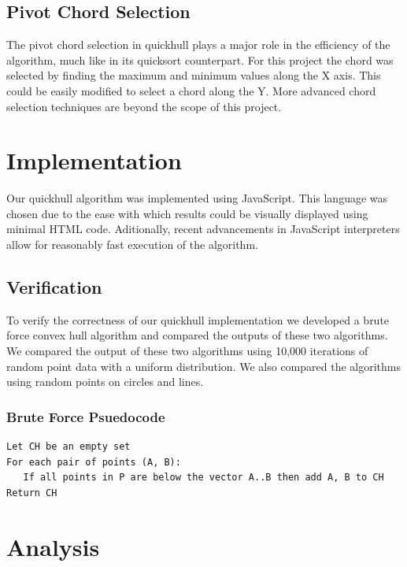 \documentclass[11pt]{article}
\begin{document}
\subsection{Pivot Chord Selection}
The pivot chord selection in quickhull plays a major role in the efficiency of the algorithm, much like in its quicksort counterpart. For this project the chord was selected by finding the maximum and minimum values along the X axis. This could be easily modified to select a chord along the Y. More advanced chord selection techniques are beyond the scope of this project.

\section{Implementation}
Our quickhull algorithm was implemented using JavaScript. This language was chosen due to the ease with which results could be visually displayed using minimal HTML code. Aditionally, recent advancements in JavaScript interpreters allow for reasonably fast execution of the algorithm.

\subsection{Verification}
To verify the correctness of our quickhull implementation we developed a brute force convex hull algorithm and compared the outputs of these two algorithms. We compared the output of these two algorithms using 10,000 iterations of random point data with a uniform distribution. We also compared the algorithms using random points on circles and lines.

\subsubsection{Brute Force Psuedocode}
\begin{verbatim}
Let CH be an empty set
For each pair of points (A, B):
   If all points in P are below the vector A..B then add A, B to CH
Return CH
\end{verbatim}

\section{Analysis}
\end{document}
